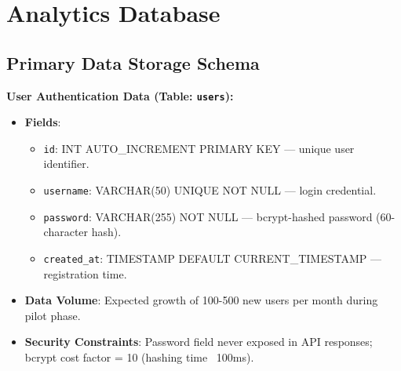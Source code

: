 



\section{Analytics Database}

\subsection{Primary Data Storage Schema}

\textbf{User Authentication Data (Table: \texttt{users}):}
\begin{itemize}
    \item \textbf{Fields}:
    \begin{itemize}
        \item \texttt{id}: INT AUTO\_INCREMENT PRIMARY KEY — unique user identifier.
        \item \texttt{username}: VARCHAR(50) UNIQUE NOT NULL — login credential.
        \item \texttt{password}: VARCHAR(255) NOT NULL — bcrypt-hashed password (60-character hash).
        \item \texttt{created\_at}: TIMESTAMP DEFAULT CURRENT\_TIMESTAMP — registration time.
    \end{itemize}
    \item \textbf{Data Volume}: Expected growth of 100-500 new users per month during pilot phase.
    \item \textbf{Security Constraints}: Password field never exposed in API responses; bcrypt cost factor = 10 (hashing time ~100ms).
\end{itemize}


